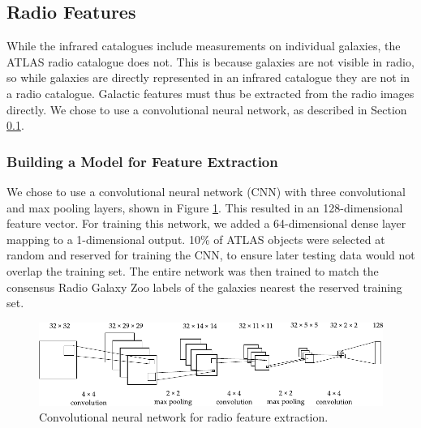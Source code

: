 

  \subsection{Radio Features}
  \label{sec:image-features}

    While the infrared catalogues include measurements on individual galaxies,
    the ATLAS radio catalogue does not. This is because galaxies are not
    visible in radio, so while galaxies are directly represented in an infrared
    catalogue they are not in a radio catalogue. Galactic features must thus be
    extracted from the radio images directly. We chose to use a convolutional
    neural network, as described in Section \ref{sec:image-features}.

    \subsubsection{Building a Model for Feature Extraction}
    \label{sec:feature-extraction-model}

      We chose to use a convolutional neural network (CNN) with three
      convolutional and max pooling layers, shown in Figure \ref{fig:radio-cnn}.
      This resulted in an 128-dimensional feature vector. For training this
      network, we added a 64-dimensional dense layer mapping to a 1-dimensional
      output. 10\% of ATLAS objects were selected at random and reserved for
      training the CNN, to ensure later testing data would not overlap the
      training set. The entire network was then trained to match the consensus
      Radio Galaxy Zoo labels of the galaxies nearest the reserved training set.

      \begin{figure}[!ht]
         \centering
         \includegraphics[width=\textwidth]{images/cnn_new.pdf}
         \caption{Convolutional neural network for radio feature extraction.}
         \label{fig:radio-cnn}
       \end{figure}

